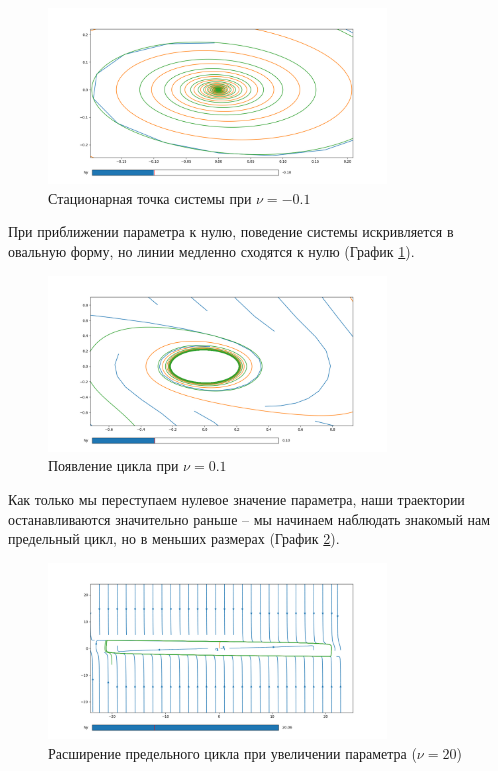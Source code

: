 \begin{figure}[!ht]
    \centering
    \includegraphics[width=0.8\textwidth]{figures/2_point_-0_1}
    \caption{Стационарная точка системы при $\nu = -0.1$}
    \label{lab2:point_0}
\end{figure}

При приближении параметра к нулю, поведение системы искривляется в овальную
форму, но линии медленно сходятся к нулю (График \ref{lab2:point_0}).

\begin{figure}[!ht]
    \centering
    \includegraphics[width=0.8\textwidth]{figures/2_cycle_0_1}
    \caption{Появление цикла при $\nu = 0.1$}
    \label{lab2:cycle_0_1}
\end{figure}

Как только мы переступаем нулевое значение параметра, наши траектории
останавливаются значительно раньше -- мы начинаем наблюдать знакомый нам
предельный цикл, но в меньших размерах (График \ref{lab2:cycle_0_1}).

\begin{figure}[!ht]
    \centering
    \includegraphics[width=0.8\textwidth]{figures/2_cycle_20}
    \caption{Расширение предельного цикла при увеличении параметра ($\nu = 20$)}
    \label{lab2:cycle_20}
\end{figure}

